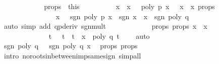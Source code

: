 \begin{isabellebody}
\ {\isasymxi}\ \isacommand{{\isachardot}{\isachardot}}\isamarkupfalse%
\isanewline
\ \ \ \ \ \ \ \ \isamarkupfalse%
\ {\isasymxi}{\isacharunderscore}props\ {\isacharequal}\ this\isanewline
\ \ \ \ \ \ \ \ \isamarkupfalse%
\ {\isacharbackquoteopen}{\isasymbar}x\ {\isacharminus}\ x\ {\isacharless}\ {\isasymepsilon}{\isacharbackquoteclose}\ {\isacharbackquoteopen}poly\ p\ x\ {\isacharequal}\ {}{\isacharbackquoteclose}\ {\isacharbackquoteopen}x\ {\isachargreater}\ x\ {\isasymepsilon}{\isacharunderscore}props\isanewline
\ \ \ \ \ \ \ \ \ \ \ \ \isamarkupfalse%
\ {\isachardoublequoteopen}{\isasymbar}{\isasymxi}\ {\isacharminus}\ x\ {\isacharless}\ {\isasymepsilon}{\isachardoublequoteclose}\ {\isachardoublequoteopen}sgn\ {\isacharparenleft}poly\ p\ x{\isacharparenright}\ {\isacharequal}\ sgn\ {\isacharparenleft}x\ {\isacharminus}\ x\ {\isacharasterisk}\ sgn\ {\isacharparenleft}poly\ q\ {\isasymxi}{\isacharparenright}{\isachardoublequoteclose}\ \isanewline
\ \ \ \ \ \ \ \ \ \ \ \ \isamarkupfalse%
\ {\isacharparenleft}auto\ simp\ add{\isacharcolon}\ q{\isacharunderscore}pderiv\ sgn{\isacharunderscore}mult{\isacharparenright}\ \isanewline
\ \ \ \ \ \ \ \ \isamarkupfalse%
\ \isamarkupfalse%
\ {\isasymxi}{\isacharunderscore}props\ {\isasymepsilon}{\isacharunderscore}props\ {\isacharbackquoteopen}{\isasymbar}x\ {\isacharminus}\ x\ {\isacharless}\ {\isasymepsilon}{\isacharbackquoteclose}\ \isanewline
\ \ \ \ \ \ \ \ \ \ \ \ \isamarkupfalse%
\ {\isachardoublequoteopen}{\isasymforall}t{\isachardot}\ {\isasymxi}\ {\isasymle}\ t\ {\isasymand}\ t\ {\isasymle}\ x\ {\isasymlongrightarrow}\ poly\ q\ t\ {\isasymnoteq}\ {}{\isachardoublequoteclose}\ \isamarkupfalse%
\ auto\isanewline
\ \ \ \ \ \ \ \ \isamarkupfalse%
\ {\isachardoublequoteopen}sgn\ {\isacharparenleft}poly\ q\ {\isasymxi}{\isacharparenright}\ {\isacharequal}\ sgn\ {\isacharparenleft}poly\ q\ x{\isacharparenright}{\isachardoublequoteclose}\ \isamarkupfalse%
\ {\isasymxi}{\isacharunderscore}props\ {\isasymepsilon}{\isacharunderscore}props\isanewline
\ \ \ \ \ \ \ \ \ \ \ \ \isamarkupfalse%
\ {\isacharparenleft}intro\ no{\isacharunderscore}roots{\isacharunderscore}inbetween{\isacharunderscore}imp{\isacharunderscore}same{\isacharunderscore}sign{\isacharcomma}\ simp{\isacharunderscore}all{\isacharparenright}\isanewline

\end{isabellebody}
